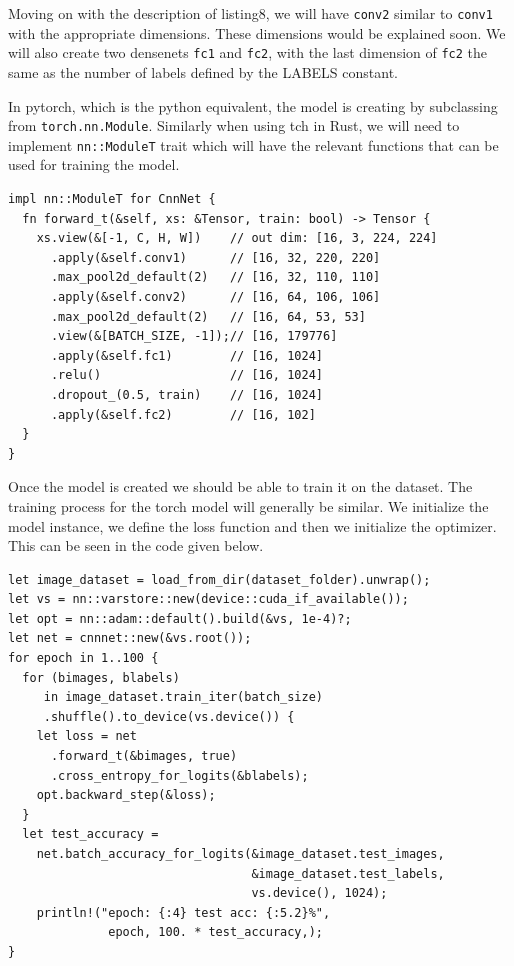 \documentclass{book}
\begin{document}
Moving on with the description of listing8, we will have \lstinline{conv2} similar to \lstinline{conv1} with the appropriate dimensions. These dimensions would be explained soon. We will also create two densenets \lstinline{fc1} and \lstinline{fc2}, with the last dimension of \lstinline{fc2} the same as the number of labels defined by the LABELS constant.

In pytorch, which is the python equivalent, the model is creating by subclassing from \lstinline{torch.nn.Module}. Similarly when using tch in Rust, we will need to implement \lstinline{nn::ModuleT} trait which will have the relevant functions that can be used for training the model.

\begin{lstlisting}[caption={chapter6/pytorch-image-classification/src/main.rs}, basicstyle=\small]
impl nn::ModuleT for CnnNet {
  fn forward_t(&self, xs: &Tensor, train: bool) -> Tensor {
    xs.view(&[-1, C, H, W])    // out dim: [16, 3, 224, 224]
      .apply(&self.conv1)      // [16, 32, 220, 220]
      .max_pool2d_default(2)   // [16, 32, 110, 110]
      .apply(&self.conv2)      // [16, 64, 106, 106]
      .max_pool2d_default(2)   // [16, 64, 53, 53]
      .view(&[BATCH_SIZE, -1]);// [16, 179776]
      .apply(&self.fc1)        // [16, 1024]
      .relu()                  // [16, 1024]
      .dropout_(0.5, train)    // [16, 1024]
      .apply(&self.fc2)        // [16, 102]
  }
}
\end{lstlisting}

Once the model is created we should be able to train it on the dataset. The training process for the torch model will generally be similar. We initialize the model instance, we define the loss function and then we initialize the optimizer. This can be seen in the code given below.

\begin{lstlisting}[caption={chapter6/pytorch-image-classification/src/main.rs}, basicstyle=\small]
let image_dataset = load_from_dir(dataset_folder).unwrap();
let vs = nn::varstore::new(device::cuda_if_available());
let opt = nn::adam::default().build(&vs, 1e-4)?;
let net = cnnnet::new(&vs.root());
for epoch in 1..100 {
  for (bimages, blabels)
 	 in image_dataset.train_iter(batch_size)
	 .shuffle().to_device(vs.device()) {
    let loss = net
      .forward_t(&bimages, true)
      .cross_entropy_for_logits(&blabels);
    opt.backward_step(&loss);
  }
  let test_accuracy =
    net.batch_accuracy_for_logits(&image_dataset.test_images,
                                  &image_dataset.test_labels,
                                  vs.device(), 1024);
    println!("epoch: {:4} test acc: {:5.2}%",
              epoch, 100. * test_accuracy,);
}
\end{lstlisting}
\end{document}
